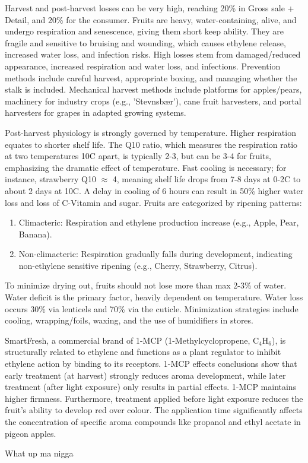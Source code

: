 \vspace{0.5em}
Harvest and post-harvest losses can be very high, reaching 20\% in Gross sale + Detail, and 20\% for the consumer. Fruits are heavy, water-containing, alive, and undergo respiration and senescence, giving them short keep ability. They are fragile and sensitive to bruising and wounding, which causes ethylene release, increased water loss, and infection risks. High losses stem from damaged/reduced appearance, increased respiration and water loss, and infections. Prevention methods include careful harvest, appropriate boxing, and managing whether the stalk is included. Mechanical harvest methods include platforms for apples/pears, machinery for industry crops (e.g., 'Stevnsbær'), cane fruit harvesters, and portal harvesters for grapes in adapted growing systems.

\vspace{0.5em}
Post-harvest physiology is strongly governed by temperature. Higher respiration equates to shorter shelf life. The Q10 ratio, which measures the respiration ratio at two temperatures 10\textdegree C apart, is typically 2-3, but can be 3-4 for fruits, emphasizing the dramatic effect of temperature. Fast cooling is necessary; for instance, strawberry Q10 $\approx$ 4, meaning shelf life drops from 7-8 days at 0-2\textdegree C to about 2 days at 10\textdegree C. A delay in cooling of 6 hours can result in 50\% higher water loss and loss of C-Vitamin and sugar. Fruits are categorized by ripening patterns: \begin{enumerate} \item Climacteric: Respiration and ethylene production increase (e.g., Apple, Pear, Banana). \item Non-climacteric: Respiration gradually falls during development, indicating non-ethylene sensitive ripening (e.g., Cherry, Strawberry, Citrus). \end{enumerate} To minimize drying out, fruits should not lose more than max 2-3\% of water. Water deficit is the primary factor, heavily dependent on temperature. Water loss occurs 30\% via lenticels and 70\% via the cuticle. Minimization strategies include cooling, wrapping/foils, waxing, and the use of humidifiers in stores.

\vspace{0.5em}
SmartFresh, a commercial brand of 1-MCP (1-Methylcyclopropene, C$_4$H$_6$), is structurally related to ethylene and functions as a plant regulator to inhibit ethylene action by binding to its receptors. 1-MCP effects conclusions show that early treatment (at harvest) strongly reduces aroma development, while later treatment (after light exposure) only results in partial effects. 1-MCP maintains higher firmness. Furthermore, treatment applied before light exposure reduces the fruit's ability to develop red over colour. The application time significantly affects the concentration of specific aroma compounds like propanol and ethyl acetate in pigeon apples.


What up ma nigga